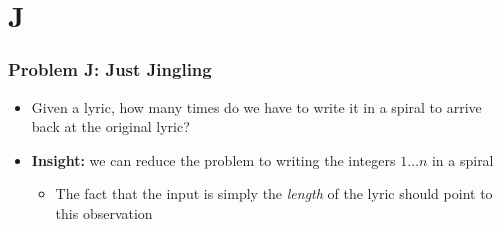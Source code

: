 \section{J}%
 \setcounter{MaxMatrixCols}{20}
\label{sec:j}

\begin{frame}
  \frametitle{Problem J: Just Jingling}

  \begin{itemize}
    \item Given a lyric, how many times do we have to write it in a spiral to arrive back at the original lyric?
    \item \textbf{Insight:} we can reduce the problem to writing the integers $1\dots n$ in a spiral
      \begin{itemize}
        \item The fact that the input is simply the \textit{length} of the lyric should point to this observation
      \end{itemize}
  \end{itemize}
\end{frame}

